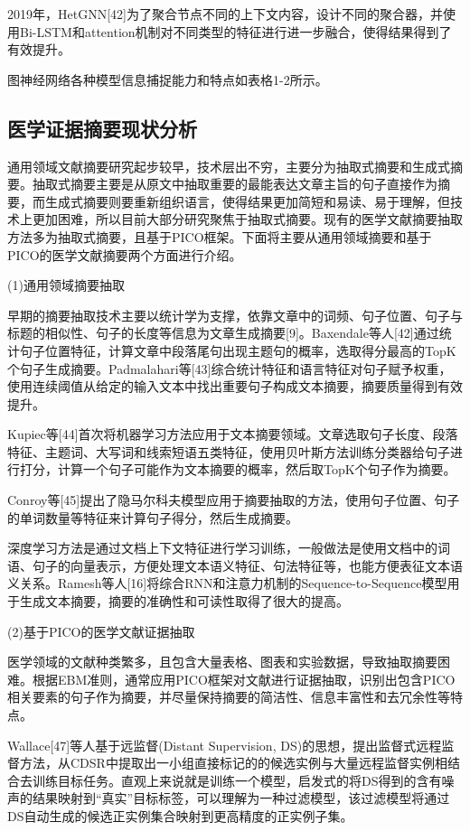 \documentclass[algorithmlist, figurelist,tablelist, nomlist,masters]{seuthesix}
\begin{document}
2019年，HetGNN[42]为了聚合节点不同的上下文内容，设计不同的聚合器，并使用Bi-LSTM和attention机制对不同类型的特征进行进一步融合，使得结果得到了有效提升。

图神经网络各种模型信息捕捉能力和特点如表格1-2所示。


\subsection{医学证据摘要现状分析}

通用领域文献摘要研究起步较早，技术层出不穷，主要分为抽取式摘要和生成式摘要。抽取式摘要主要是从原文中抽取重要的最能表达文章主旨的句子直接作为摘要，而生成式摘要则要重新组织语言，使得结果更加简短和易读、易于理解，但技术上更加困难，所以目前大部分研究聚焦于抽取式摘要。现有的医学文献摘要抽取方法多为抽取式摘要，且基于PICO框架。下面将主要从通用领域摘要和基于PICO的医学文献摘要两个方面进行介绍。

(1)通用领域摘要抽取

早期的摘要抽取技术主要以统计学为支撑，依靠文章中的词频、句子位置、句子与标题的相似性、句子的长度等信息为文章生成摘要[9]。Baxendale等人[42]通过统计句子位置特征，计算文章中段落尾句出现主题句的概率，选取得分最高的TopK个句子生成摘要。Padmalahari等[43]综合统计特征和语言特征对句子赋予权重，使用连续阈值从给定的输入文本中找出重要句子构成文本摘要，摘要质量得到有效提升。

Kupiec等[44]首次将机器学习方法应用于文本摘要领域。文章选取句子长度、段落特征、主题词、大写词和线索短语五类特征，使用贝叶斯方法训练分类器给句子进行打分，计算一个句子可能作为文本摘要的概率，然后取TopK个句子作为摘要。

Conroy等[45]提出了隐马尔科夫模型应用于摘要抽取的方法，使用句子位置、句子的单词数量等特征来计算句子得分，然后生成摘要。

深度学习方法是通过文档上下文特征进行学习训练，一般做法是使用文档中的词语、句子的向量表示，方便处理文本语义特征、句法特征等，也能方便表征文本语义关系。Ramesh等人[16]将综合RNN和注意力机制的Sequence-to-Sequence模型用于生成文本摘要，摘要的准确性和可读性取得了很大的提高。

(2)基于PICO的医学文献证据抽取

医学领域的文献种类繁多，且包含大量表格、图表和实验数据，导致抽取摘要困难。根据EBM准则，通常应用PICO框架对文献进行证据抽取，识别出包含PICO相关要素的句子作为摘要，并尽量保持摘要的简洁性、信息丰富性和去冗余性等特点。

Wallace[47]等人基于远监督(Distant Supervision, DS)的思想，提出监督式远程监督方法，从CDSR中提取出一小组直接标记的的候选实例与大量远程监督实例相结合去训练目标任务。直观上来说就是训练一个模型，启发式的将DS得到的含有噪声的结果映射到“真实”目标标签，可以理解为一种过滤模型，该过滤模型将通过DS自动生成的候选正实例集合映射到更高精度的正实例子集。
\end{document}
